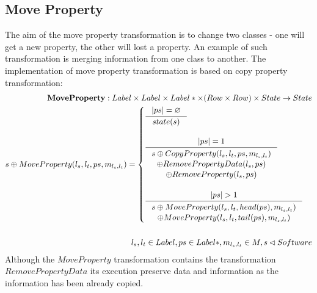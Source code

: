 \documentclass[11pt]{article}
\begin{document}
\subsection{Move Property}
The aim of the move property transformation is to change two classes - one will get a new property, the other will lost a property. An example of such transformation is merging information from one class to another. The implementation of move property transformation is based on copy property transformation:
\begin{align*}
	\mathbf{MoveProperty} : Label \times Label \times Label* \times (Row \times Row) \times State \rightarrow State \\
	s \oplus MoveProperty(l_s, l_t, ps, m_{l_s, l_t}) = \begin{cases}
 	\inference{|ps| = \varnothing}{state(s)}\\\\
 	\inference{|ps| = 1}{\begin{gathered} s \oplus CopyProperty(l_s, l_t, ps, m_{l_s, l_t}) \\ \oplus RemovePropertyData(l_s, ps) \\ \oplus RemoveProperty(l_s, ps) 
\end{gathered}}\\\\
	\inference{|ps| > 1}{\begin{gathered}
		s \oplus MoveProperty(l_s, l_t, head(ps), m_{l_s, l_t}) \\ \oplus MoveProperty(l_s, l_t, tail(ps), m_{l_s, l_t}) 
\end{gathered}}
 \end{cases}
	\\\\
	l_s, l_t \in Label, ps \in Label*,  m_{l_s, l_t} \in M, s \lhd Software
\end{align*}
Although the $MoveProperty$ transformation contains the transformation $RemovePropertyData$ its execution preserve data and information as the information has been already copied. 
\end{document}
